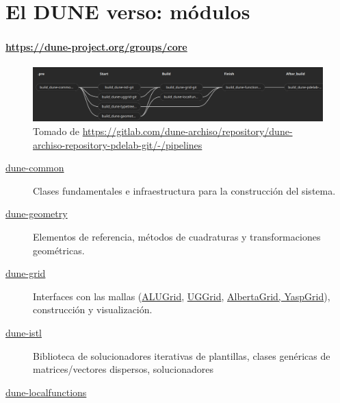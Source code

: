 \section{El DUNE verso: módulos}

\begin{frame}[fragile]
	\frametitle{\secname}
	\framesubtitle{\url{https://dune-project.org/groups/core}}

	\begin{figure}[ht!]
		\centering
		\includegraphics[width=14.6cm]{dependences}
		\caption{Tomado de \url{https://gitlab.com/dune-archiso/repository/dune-archiso-repository-pdelab-git/-/pipelines}}
	\end{figure}

	\begin{description}
		\item[\href{https://dune-project.org/modules/dune-common/}{dune-common}]

			Clases fundamentales e infraestructura para la construcción del sistema.

		\item[\href{https://dune-project.org/modules/dune-geometry/}{dune-geometry}]

			Elementos de referencia, métodos de cuadraturas y transformaciones geométricas.

		\item[\href{https://dune-project.org/modules/dune-grid/}{dune-grid}]

			Interfaces con las mallas (\href{https://dune-project.org/modules/dune-alugrid}{ALUGrid}, \href{https://dune-project.org/modules/dune-uggrid}{UGGrid}, \href{https://dune-project.org/modules/dune-grid}{AlbertaGrid, YaspGrid}), construcción y visualización.

		\item[\href{https://dune-project.org/modules/dune-istl}{dune-istl}]

			Biblioteca de solucionadores iterativas de plantillas, clases genéricas de matrices/vectores dispersos, solucionadores

		\item[\href{https://dune-project.org/modules/dune-localfunctions}{dune-localfunctions}]


\end{description}
\end{frame}
